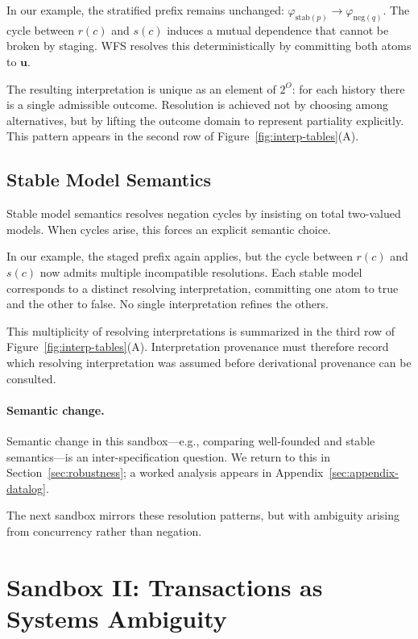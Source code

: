 \documentclass[acmsmall,nonacm]{acmart}
\theoremstyle{remark}
\numberwithin{definition}{section}
\numberwithin{theorem}{section}
\numberwithin{lemma}{section}
\numberwithin{corollary}{section}
\numberwithin{remark}{section}
\numberwithin{example}{section}
\numberwithin{observation}{section}
\numberwithin{assumption}{section}
\begin{document}
In our example, the stratified prefix remains unchanged:
$\varphi_{\mathrm{stab}(p)} \rightarrow \varphi_{\mathrm{neg}(q)}$.
The cycle between $r(c)$ and $s(c)$ induces a mutual dependence that cannot be
broken by staging.
WFS resolves this deterministically by committing both atoms to $\mathbf{u}$.

The resulting interpretation is unique as an element of $2^O$: for each history
there is a single admissible outcome.
Resolution is achieved not by choosing among alternatives, but by lifting the
outcome domain to represent partiality explicitly.
This pattern appears in the second row of
Figure~\ref{fig:interp-tables}(A).

\subsection{Stable Model Semantics}

Stable model semantics resolves negation cycles by insisting on total two-valued
models.
When cycles arise, this forces an explicit semantic choice.

In our example, the staged prefix again applies, but the cycle between $r(c)$ and
$s(c)$ now admits multiple incompatible resolutions.
Each stable model corresponds to a distinct resolving interpretation, committing
one atom to true and the other to false.
No single interpretation refines the others.

This multiplicity of resolving interpretations is summarized in the third row of
Figure~\ref{fig:interp-tables}(A).
Interpretation provenance must therefore record which resolving interpretation was
assumed before derivational provenance can be consulted.

\paragraph{Semantic change.}
Semantic change in this sandbox—e.g., comparing well-founded and stable
semantics—is an inter-specification question.
We return to this in Section~\ref{sec:robustness}; a worked analysis appears in
Appendix~\ref{sec:appendix-datalog}.

The next sandbox mirrors these resolution patterns, but with ambiguity arising
from concurrency rather than negation.

\section{Sandbox II: Transactions as Systems Ambiguity}
\label{sec:transactions}
\end{document}
